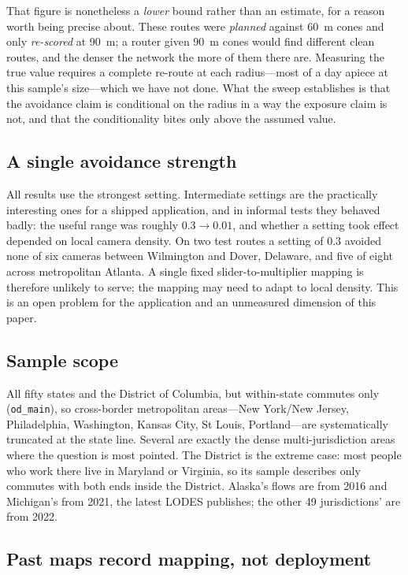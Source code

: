 \documentclass[11pt,twoside]{article}
\begin{document}
That figure is nonetheless a \emph{lower} bound rather than an estimate, for a reason worth
being precise about. These routes were \emph{planned} against \SI{60}{\metre} cones and only
\emph{re-scored} at \SI{90}{\metre}; a router given \SI{90}{\metre} cones would find
different clean routes, and the denser the network the more of them there are. Measuring
the true value requires a complete re-route at each radius---most of a day apiece at this
sample's size---which we have not done. What the sweep establishes is that the
avoidance claim is conditional on the radius in a way the exposure claim is not, and that
the conditionality bites only above the assumed value.

\subsection{A single avoidance strength}

All results use the strongest setting. Intermediate settings are the practically
interesting ones for a shipped application, and in informal tests they behaved badly: the
useful range was roughly $0.3\rightarrow0.01$, and whether a setting took effect depended on
local camera density. On two test routes a setting of \num{0.3} avoided none of six cameras
between Wilmington and Dover, Delaware, and five of eight across metropolitan Atlanta. A single
fixed slider-to-multiplier mapping is therefore unlikely to serve; the mapping may need to
adapt to local density. This is an open problem for the application and an unmeasured
dimension of this paper.

\subsection{Sample scope}

All fifty states and the District of Columbia, but within-state commutes only
(\texttt{od\_main}), so cross-border metropolitan areas---New York/New Jersey,
Philadelphia, Washington, Kansas City, St Louis, Portland---are systematically truncated at
the state line. Several are exactly the dense multi-jurisdiction areas where the question
is most pointed. The District is the extreme case: most people who work there live in
Maryland or Virginia, so its sample describes only commutes with both ends inside the
District. Alaska's flows are from 2016 and Michigan's from 2021, the latest LODES
publishes; the other 49 jurisdictions' are from 2022.

\subsection{Past maps record mapping, not deployment}
\end{document}
